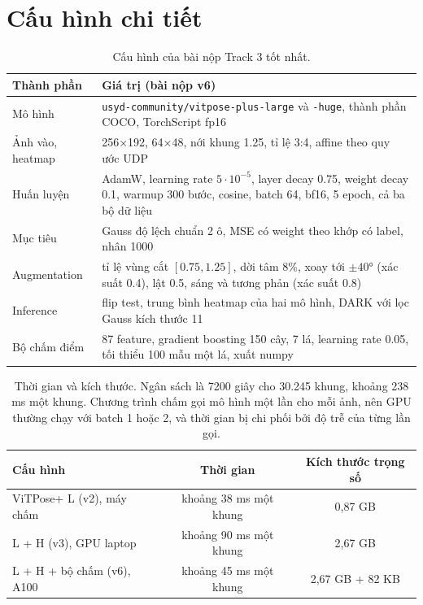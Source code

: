 \documentclass[11pt,a4paper]{article}
\begin{document}
\section{Cấu hình chi tiết}
\label{app:config}

\begin{table}[H]
\centering\small
\begin{tabularx}{\linewidth}{@{}lX@{}}
\toprule
Thành phần & Giá trị (bài nộp v6) \\
\midrule
Mô hình & \texttt{usyd-community/vitpose-plus-large} và \texttt{-huge}, thành phần COCO, TorchScript fp16 \\
Ảnh vào, heatmap & 256×192, 64×48, nới khung 1.25, tỉ lệ 3:4, affine theo quy ước UDP \\
Huấn luyện & AdamW, learning rate $5\cdot10^{-5}$, layer decay 0.75, weight decay 0.1, warmup 300 bước, cosine, batch 64, bf16, 5 epoch, cả ba bộ dữ liệu \\
Mục tiêu & Gauss độ lệch chuẩn 2 ô, MSE có weight theo khớp có label, nhân 1000 \\
Augmentation & tỉ lệ vùng cắt $[0.75,1.25]$, dời tâm 8\%, xoay tới $\pm40°$ (xác suất 0.4), lật 0.5, sáng và tương phản (xác suất 0.8) \\
Inference & flip test, trung bình heatmap của hai mô hình, DARK với lọc Gauss kích thước 11 \\
Bộ chấm điểm & 87 feature, gradient boosting 150 cây, 7 lá, learning rate 0.05, tối thiểu 100 mẫu một lá, xuất numpy \\
\bottomrule
\end{tabularx}
\caption{Cấu hình của bài nộp Track 3 tốt nhất.}
\end{table}

\begin{table}[H]
\centering\small
\begin{tabularx}{\linewidth}{@{}Xcc@{}}
\toprule
Cấu hình & Thời gian & Kích thước trọng số \\
\midrule
ViTPose+ L (v2), máy chấm & khoảng 38 ms một khung & 0,87 GB \\
L + H (v3), GPU laptop & khoảng 90 ms một khung & 2,67 GB \\
L + H + bộ chấm (v6), A100 & khoảng 45 ms một khung & 2,67 GB + 82 KB \\
\bottomrule
\end{tabularx}
\caption{Thời gian và kích thước. Ngân sách là 7200 giây cho 30.245 khung, khoảng 238 ms một khung. Chương trình chấm gọi mô hình một lần cho mỗi ảnh, nên GPU thường chạy với batch 1 hoặc 2, và thời gian bị chi phối bởi độ trễ của từng lần gọi.}
\end{table}
\end{document}

